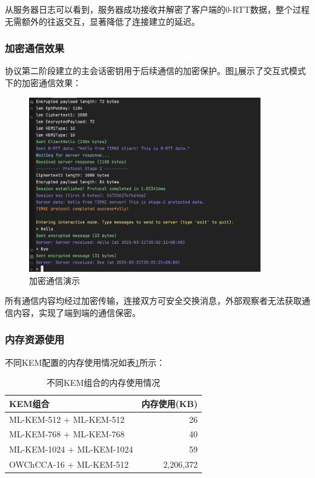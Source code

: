 从服务器日志可以看到，服务器成功接收并解密了客户端的0-RTT数据，整个过程无需额外的往返交互，显著降低了连接建立的延迟。

\subsubsection{加密通信效果}

协议第二阶段建立的主会话密钥用于后续通信的加密保护。图\ref{fig:encrypted-comm}展示了交互式模式下的加密通信效果：

\begin{figure}[ht]
\centering
\includegraphics[width=0.9\textwidth]{figures/encrypted_comm.png}
\caption{加密通信演示}
\label{fig:encrypted-comm}
\end{figure}

所有通信内容均经过加密传输，连接双方可安全交换消息，外部观察者无法获取通信内容，实现了端到端的通信保密。

\subsubsection{内存资源使用}

不同KEM配置的内存使用情况如表\ref{tab:memory-usage}所示：

\begin{table}[ht]
\centering
\caption{不同KEM组合的内存使用情况}
\label{tab:memory-usage}
\begin{tabular}{|l|r|}
\hline
\textbf{KEM组合} & \textbf{内存使用(KB)} \\
\hline
ML-KEM-512 + ML-KEM-512    & 26   \\
\hline
ML-KEM-768 + ML-KEM-768    & 40   \\
\hline
ML-KEM-1024 + ML-KEM-1024  & 59   \\
\hline
OWChCCA-16 + ML-KEM-512    & 2,206,372   \\
\hline
\end{tabular}
\end{table}

